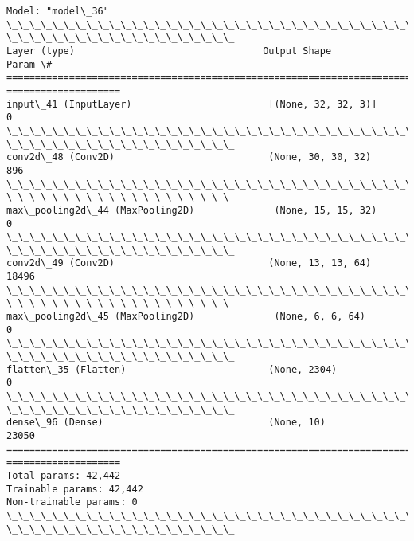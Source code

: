 \documentclass[11pt]{article}
\begin{document}
    \begin{Verbatim}[commandchars=\\\{\}]
Model: "model\_36"
\_\_\_\_\_\_\_\_\_\_\_\_\_\_\_\_\_\_\_\_\_\_\_\_\_\_\_\_\_\_\_\_\_\_\_\_\_\_\_\_\_\_\_\_\_\_\_\_\_\_\_\_\_\_\_\_\_\_\_\_\_\_\_\_\_\_\_\_\_\_\_\_\_\_\_\_\_\_\_\_
\_\_\_\_\_\_\_\_\_\_\_\_\_\_\_\_\_\_\_\_
Layer (type)                                 Output Shape
Param \#
================================================================================
====================
input\_41 (InputLayer)                        [(None, 32, 32, 3)]
0
\_\_\_\_\_\_\_\_\_\_\_\_\_\_\_\_\_\_\_\_\_\_\_\_\_\_\_\_\_\_\_\_\_\_\_\_\_\_\_\_\_\_\_\_\_\_\_\_\_\_\_\_\_\_\_\_\_\_\_\_\_\_\_\_\_\_\_\_\_\_\_\_\_\_\_\_\_\_\_\_
\_\_\_\_\_\_\_\_\_\_\_\_\_\_\_\_\_\_\_\_
conv2d\_48 (Conv2D)                           (None, 30, 30, 32)
896
\_\_\_\_\_\_\_\_\_\_\_\_\_\_\_\_\_\_\_\_\_\_\_\_\_\_\_\_\_\_\_\_\_\_\_\_\_\_\_\_\_\_\_\_\_\_\_\_\_\_\_\_\_\_\_\_\_\_\_\_\_\_\_\_\_\_\_\_\_\_\_\_\_\_\_\_\_\_\_\_
\_\_\_\_\_\_\_\_\_\_\_\_\_\_\_\_\_\_\_\_
max\_pooling2d\_44 (MaxPooling2D)              (None, 15, 15, 32)
0
\_\_\_\_\_\_\_\_\_\_\_\_\_\_\_\_\_\_\_\_\_\_\_\_\_\_\_\_\_\_\_\_\_\_\_\_\_\_\_\_\_\_\_\_\_\_\_\_\_\_\_\_\_\_\_\_\_\_\_\_\_\_\_\_\_\_\_\_\_\_\_\_\_\_\_\_\_\_\_\_
\_\_\_\_\_\_\_\_\_\_\_\_\_\_\_\_\_\_\_\_
conv2d\_49 (Conv2D)                           (None, 13, 13, 64)
18496
\_\_\_\_\_\_\_\_\_\_\_\_\_\_\_\_\_\_\_\_\_\_\_\_\_\_\_\_\_\_\_\_\_\_\_\_\_\_\_\_\_\_\_\_\_\_\_\_\_\_\_\_\_\_\_\_\_\_\_\_\_\_\_\_\_\_\_\_\_\_\_\_\_\_\_\_\_\_\_\_
\_\_\_\_\_\_\_\_\_\_\_\_\_\_\_\_\_\_\_\_
max\_pooling2d\_45 (MaxPooling2D)              (None, 6, 6, 64)
0
\_\_\_\_\_\_\_\_\_\_\_\_\_\_\_\_\_\_\_\_\_\_\_\_\_\_\_\_\_\_\_\_\_\_\_\_\_\_\_\_\_\_\_\_\_\_\_\_\_\_\_\_\_\_\_\_\_\_\_\_\_\_\_\_\_\_\_\_\_\_\_\_\_\_\_\_\_\_\_\_
\_\_\_\_\_\_\_\_\_\_\_\_\_\_\_\_\_\_\_\_
flatten\_35 (Flatten)                         (None, 2304)
0
\_\_\_\_\_\_\_\_\_\_\_\_\_\_\_\_\_\_\_\_\_\_\_\_\_\_\_\_\_\_\_\_\_\_\_\_\_\_\_\_\_\_\_\_\_\_\_\_\_\_\_\_\_\_\_\_\_\_\_\_\_\_\_\_\_\_\_\_\_\_\_\_\_\_\_\_\_\_\_\_
\_\_\_\_\_\_\_\_\_\_\_\_\_\_\_\_\_\_\_\_
dense\_96 (Dense)                             (None, 10)
23050
================================================================================
====================
Total params: 42,442
Trainable params: 42,442
Non-trainable params: 0
\_\_\_\_\_\_\_\_\_\_\_\_\_\_\_\_\_\_\_\_\_\_\_\_\_\_\_\_\_\_\_\_\_\_\_\_\_\_\_\_\_\_\_\_\_\_\_\_\_\_\_\_\_\_\_\_\_\_\_\_\_\_\_\_\_\_\_\_\_\_\_\_\_\_\_\_\_\_\_\_
\_\_\_\_\_\_\_\_\_\_\_\_\_\_\_\_\_\_\_\_
    \end{Verbatim}
\end{document}

